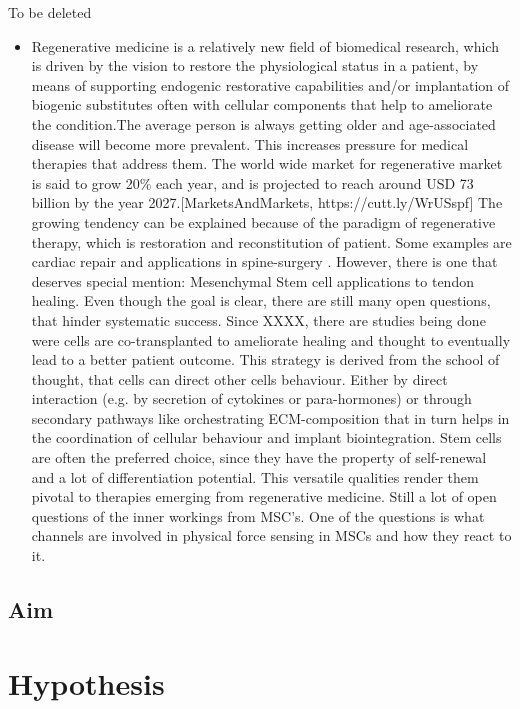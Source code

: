 To be deleted 
\begin{itemize}
    \item Regenerative medicine is a relatively new field of biomedical research, which is driven by the vision to restore the physiological status in a patient, by means of supporting endogenic restorative capabilities and/or implantation of biogenic substitutes often with cellular components that help to ameliorate the condition.The average person is always getting older and age-associated disease will become more prevalent. This increases pressure for medical therapies that address them. The world wide market for regenerative market is said to grow 20\% each year, and is projected to reach around USD 73 billion by the year 2027.[MarketsAndMarkets, https://cutt.ly/WrUSspf] The growing tendency can be explained because of the paradigm of regenerative therapy, which is restoration and reconstitution of patient. Some examples are cardiac repair \cite{Pittenger2004} and applications in spine-surgery \cite{Goldschlager2010}. However, there is one that deserves special mention: Mesenchymal Stem cell applications to tendon healing. Even though the goal is clear, there are still many open questions, that hinder systematic success. Since XXXX, there are studies being done were cells are co-transplanted to ameliorate healing and thought to eventually lead to a better patient outcome. This strategy is derived from the school of thought, that cells can direct other cells behaviour. Either by direct interaction (e.g. by secretion of cytokines or para-hormones) or through secondary pathways like orchestrating ECM-composition that in turn helps in the coordination of cellular behaviour and implant biointegration. Stem cells are often the preferred choice, since they have the property of self-renewal and a lot of differentiation potential. 
 This versatile qualities render them pivotal to therapies emerging from regenerative medicine. Still a lot of open questions of the inner workings from MSC's. One of the questions is what channels are involved in physical force sensing in MSCs and how they react to it. 
\end{itemize}

\subsection{Aim}


\section{Hypothesis}

